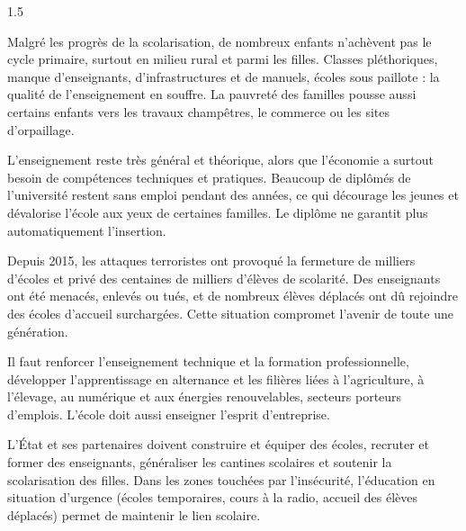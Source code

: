 \documentclass[12pt]{article}
\begin{document}
\begin{spacing}{1.5}


Malgré les progrès de la scolarisation, de nombreux enfants n'achèvent pas le cycle primaire, surtout en milieu rural et parmi les filles. Classes pléthoriques, manque d'enseignants, d'infrastructures et de manuels, écoles sous paillote : la qualité de l'enseignement en souffre. La pauvreté des familles pousse aussi certains enfants vers les travaux champêtres, le commerce ou les sites d'orpaillage.

L'enseignement reste très général et théorique, alors que l'économie a surtout besoin de compétences techniques et pratiques. Beaucoup de diplômés de l'université restent sans emploi pendant des années, ce qui décourage les jeunes et dévalorise l'école aux yeux de certaines familles. Le diplôme ne garantit plus automatiquement l'insertion.

Depuis 2015, les attaques terroristes ont provoqué la fermeture de milliers d'écoles et privé des centaines de milliers d'élèves de scolarité. Des enseignants ont été menacés, enlevés ou tués, et de nombreux élèves déplacés ont dû rejoindre des écoles d'accueil surchargées. Cette situation compromet l'avenir de toute une génération.



Il faut renforcer l'enseignement technique et la formation professionnelle, développer l'apprentissage en alternance et les filières liées à l'agriculture, à l'élevage, au numérique et aux énergies renouvelables, secteurs porteurs d'emplois. L'école doit aussi enseigner l'esprit d'entreprise.

L'État et ses partenaires doivent construire et équiper des écoles, recruter et former des enseignants, généraliser les cantines scolaires et soutenir la scolarisation des filles. Dans les zones touchées par l'insécurité, l'éducation en situation d'urgence (écoles temporaires, cours à la radio, accueil des élèves déplacés) permet de maintenir le lien scolaire.


\end{spacing}
\end{document}
